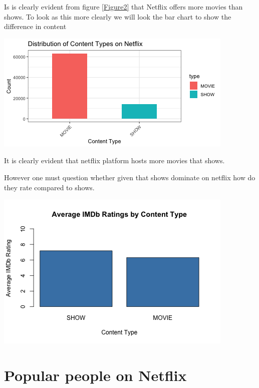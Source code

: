 \documentclass[12pt,preprint, authoryear]{elsarticle}
\let\origfigure\figure
\let\endorigfigure\endfigure
\renewenvironment{figure}[1][2] {
    \expandafter\origfigure\expandafter[H]
} {
    \endorigfigure
}
\numberwithin{equation}{section}
\numberwithin{figure}{section}
\numberwithin{table}{section}
\begin{document}
Is is clearly evident from figure \ref{Figure2} that Netflix offers more
movies than shows. To look as this more clearly we will look the bar
chart to show the difference in content

\begin{figure}[H]

{\centering \includegraphics{Q4_files/figure-latex/Figure3-1} 

}

\caption{Bar graph \label{Figure3}}\label{fig:Figure3}
\end{figure}

It is clearly evident that netflix platform hosts more movies that
shows.

However one must question whether given that shows dominate on netflix
how do they rate compared to shows.

\begin{figure}[H]

{\centering \includegraphics{Q4_files/figure-latex/Figure4-1} 

}

\caption{Average ratings  \label{Figure4}}\label{fig:Figure4}
\end{figure}

\hypertarget{popular-people-on-netflix}{%
\section{Popular people on Netflix~}\label{popular-people-on-netflix}}
\end{document}

